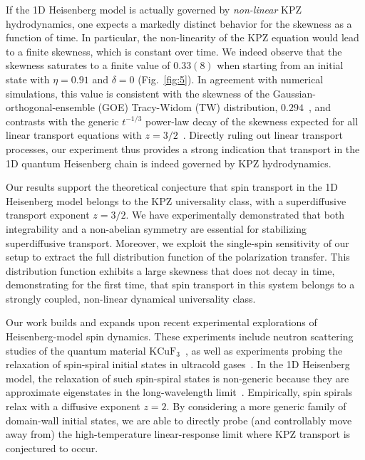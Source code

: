 \documentclass[
 reprint,
 superscriptaddress,
 amsmath,amssymb,
 aps,
 pra,
]{revtex4-2}
\begin{document}
If the 1D Heisenberg model is actually governed by \emph{non-linear} KPZ hydrodynamics, one expects a markedly distinct behavior for the skewness as a function of time.
%
In particular, the non-linearity of the KPZ equation would lead to a finite skewness, which is constant over time.
%
We indeed observe that the skewness saturates to a finite value of $0.33(8)$ when starting from an initial state with $\eta = 0.91$ and $\delta=0$ (Fig.~\ref{fig:5}).
%
In agreement with numerical simulations, this value is consistent with the skewness of the Gaussian-orthogonal-ensemble (GOE) Tracy-Widom (TW) distribution, $0.294$~\cite{Prahofer2000}, and contrasts with the generic $t^{-1/3}$ power-law decay of the skewness expected for all linear transport equations with $z=3/2$~\cite{SI}.
%
Directly ruling out linear transport processes, our experiment thus provides a strong indication that transport in the 1D quantum Heisenberg chain is indeed governed by KPZ hydrodynamics.




Our results support the theoretical conjecture that spin transport in the 1D Heisenberg model belongs to the KPZ universality class, with a superdiffusive transport exponent $z = 3/2$.
%
We have experimentally demonstrated that both integrability and a non-abelian symmetry are essential for stabilizing superdiffusive transport.
%
Moreover, we exploit the single-spin sensitivity of our setup to extract the full distribution function of the polarization transfer.
%
This distribution function exhibits a large skewness that does not decay in time, demonstrating for the first time, that spin transport in this system belongs to a strongly coupled, non-linear dynamical universality class.


Our work builds and expands upon recent experimental explorations of Heisenberg-model spin dynamics.
%
These experiments include neutron scattering studies of the quantum material $\textrm{KCuF}_3$~\cite{Scheie2021}, as well as experiments probing the relaxation of spin-spiral initial states in ultracold gases~\cite{Hild2014,Jepsen2020,Jepsen2021}.
%
In the 1D Heisenberg model, the relaxation of such spin-spiral states is non-generic because they are approximate eigenstates in the long-wavelength limit~\cite{Bulchandani2021}.
Empirically, spin spirals relax with a diffusive exponent $z = 2$.
%
By considering a more generic family of domain-wall initial states, we are able to directly probe (and controllably move away from) the high-temperature linear-response limit where KPZ transport is conjectured to occur.
\end{document}

